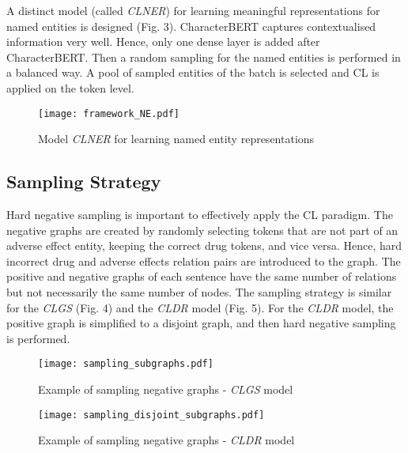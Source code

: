 \documentclass[11pt]{article}
\begin{document}
A distinct model (called \textit{CLNER}) for learning meaningful representations for named entities is designed (Fig. 3). CharacterBERT captures contextualised information very well. Hence, only one dense layer is added after CharacterBERT. Then a random sampling for the named entities is performed in a balanced way. A pool of sampled entities of the batch is selected and CL is applied on the token level.

\begin{figure}[!h]
  \centering
  \texttt{[image: framework\_NE.pdf]}
  \vspace{-1ex}  
  \caption{Model \textit{CLNER} for learning named entity representations}
  \vspace{-4mm}
\end{figure}

\vspace{-1.5mm}

\subsection{Sampling Strategy}

Hard negative sampling is important to effectively apply the CL paradigm. The negative graphs are created by randomly selecting tokens that are not part of an adverse effect entity, keeping the correct drug tokens, and vice versa. Hence, hard incorrect drug and adverse effects relation pairs are introduced to the graph. The positive and negative graphs of each sentence have the same number of relations but not necessarily the same number of nodes. The sampling strategy is similar for the \textit{CLGS} (Fig. 4) and the \textit{CLDR} model (Fig. 5). For the \textit{CLDR} model, the positive graph is simplified to a disjoint graph, and then hard negative sampling is performed.

\begin{figure}[!h]
  \centering
  \texttt{[image: sampling\_subgraphs.pdf]}
  \vspace{-1ex} 
  \caption{Example of sampling negative graphs - \textit{CLGS} model}
\end{figure}

\begin{figure}[!h]
  \centering
  \texttt{[image: sampling\_disjoint\_subgraphs.pdf]}
  \vspace{-1ex} 
  \caption{Example of sampling negative graphs - \textit{CLDR} model}
  \vspace{-4.5mm}
\end{figure}
\end{document}
